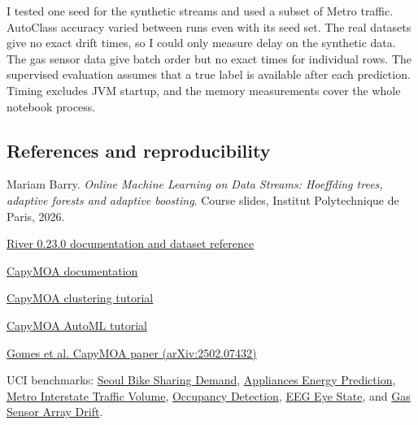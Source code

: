 \documentclass[11pt,a4paper]{article}
\begin{document}
I tested one seed for the synthetic streams and used a subset of Metro traffic. AutoClass accuracy varied between runs even with its seed set. The real datasets give no exact drift times, so I could only measure delay on the synthetic data. The gas sensor data give batch order but no exact times for individual rows. The supervised evaluation assumes that a true label is available after each prediction. Timing excludes JVM startup, and the memory measurements cover the whole notebook process.

\subsection*{References and reproducibility}

{\small Mariam Barry. \textit{Online Machine Learning on Data Streams: Hoeffding trees, adaptive forests and adaptive boosting}. Course slides, Institut Polytechnique de Paris, 2026.\par}

{\small \href{https://riverml.xyz/0.23.0/}{River 0.23.0 documentation and dataset reference}\par}

{\small \href{https://capymoa.org/}{CapyMOA documentation}\par}

{\small \href{https://capymoa.org/notebooks/clusterer/clustering.html}{CapyMOA clustering tutorial}\par}

{\small \href{https://capymoa.org/notebooks/automl/automl.html}{CapyMOA AutoML tutorial}\par}

{\small \href{https://arxiv.org/abs/2502.07432}{Gomes et al. CapyMOA paper (arXiv:2502.07432)}\par}

{\small UCI benchmarks:
\href{https://archive.ics.uci.edu/dataset/560/seoul+bike+sharing+demand}{Seoul Bike Sharing Demand},
\href{https://archive.ics.uci.edu/dataset/374/appliances+energy+prediction}{Appliances Energy Prediction},
\href{https://archive.ics.uci.edu/dataset/492/metro+interstate+traffic+volume}{Metro Interstate Traffic Volume},
\href{https://archive.ics.uci.edu/dataset/357/occupancy+detection}{Occupancy Detection},
\href{https://archive.ics.uci.edu/dataset/264/eeg+eye+state}{EEG Eye State}, and
\href{https://archive.ics.uci.edu/dataset/224/gas+sensor+array+drift+dataset}{Gas Sensor Array Drift}.\par}
\end{document}
